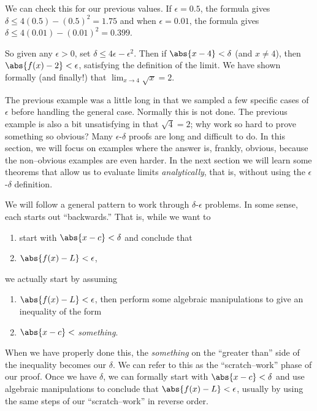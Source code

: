 {We can check this for our previous values.  If $\epsilon=0.5$, the formula gives
$\delta \leq 4(0.5) - (0.5)^2 = 1.75$ and when $\epsilon=0.01$, the formula gives $\delta \leq 4(0.01) - (0.01)^2 = 0.399$.

So given any $\epsilon >0$, set $\delta \leq 4\epsilon - \epsilon^2$. Then if $\abs{x-4}<\delta$ (and $x\neq 4$), then $\abs{f(x) - 2} < \epsilon$,  satisfying the definition of the limit.  We have shown formally (and finally!) that $\displaystyle \lim_{x\rightarrow 4} \sqrt{x} = 2 $.}

The previous example was a little long in that we sampled a few specific cases of $\epsilon$ before handling the general case. Normally this is not done.  The previous example is also a bit unsatisfying in that $\sqrt{4}=2$; why work so hard to prove something so obvious? Many $\epsilon$-$\delta$ proofs are long and difficult to do. In this section, we will focus on examples where the answer is, frankly, obvious, because the non--obvious examples are even harder. In the next section we will learn some theorems that allow us to evaluate limits \textit{analytically}, that is, without using the $\epsilon$-$\delta$ definition.

We will follow a general pattern to work through $\delta$-$\epsilon$ problems. In some sense, each starts out ``backwards.'' That is, while we want to
\begin{enumerate}
	\item start with $\abs{x-c}<\delta$ and conclude that
	\item $\abs{f(x)-L}<\epsilon$,
\end{enumerate}
we actually start by assuming 
\begin{enumerate}
	\item $\abs{f(x)-L}<\epsilon$, then perform some algebraic manipulations to give an inequality of the form
	\item $\abs{x-c}<$ \textit{something}.
\end{enumerate} 
When we have properly done this, the \textit{something} on the ``greater than'' side of the inequality becomes our $\delta$. We can refer to this as the ``scratch--work'' phase of our proof. Once we have $\delta$, we can formally start with $\abs{x-c}<\delta$ and use algebraic manipulations to conclude that $\abs{f(x)-L}<\epsilon$, usually by using the same steps of our ``scratch--work'' in reverse order.

